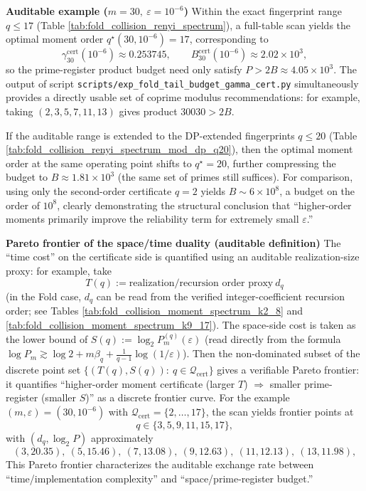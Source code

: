 \begin{remark}
\medskip\noindent\textbf{Auditable example (\(m=30,\ \varepsilon=10^{-6}\))}
Within the exact fingerprint range \(q\le 17\) (Table \ref{tab:fold_collision_renyi_spectrum}), a full-table scan yields the optimal moment order \(q^\star(30,10^{-6})=17\), corresponding to
\[
\gamma^{\mathrm{cert}}_{30}(10^{-6})\approx 0.253745,\qquad
B^{\mathrm{cert}}_{30}(10^{-6})\approx 2.02\times 10^3,
\]
so the prime-register product budget need only satisfy \(P>2B\approx 4.05\times 10^3\).
The output of script \texttt{scripts/exp\_fold\_tail\_budget\_gamma\_cert.py} simultaneously provides a directly usable set of coprime modulus recommendations: for example, taking \((2,3,5,7,11,13)\) gives product \(30030>2B\).
\par
If the auditable range is extended to the DP-extended fingerprints \(q\le 20\) (Table \ref{tab:fold_collision_renyi_spectrum_mod_dp_q20}), then the optimal moment order at the same operating point shifts to \(q^\star=20\), further compressing the budget to \(B\approx 1.81\times 10^3\) (the same set of primes still suffices).
For comparison, using only the second-order certificate \(q=2\) yields \(B\sim 6\times 10^8\), a budget on the order of $10^8$, clearly demonstrating the structural conclusion that ``higher-order moments primarily improve the reliability term for extremely small \(\varepsilon\).''

\medskip\noindent\textbf{Pareto frontier of the space/time duality (auditable definition)}
The ``time cost'' on the certificate side is quantified using an auditable realization-size proxy: for example, take
\[
T(q):=\text{realization/recursion order proxy}\ d_q
\]
(in the Fold case, \(d_q\) can be read from the verified integer-coefficient recursion order; see Tables \ref{tab:fold_collision_moment_spectrum_k2_8} and \ref{tab:fold_collision_moment_spectrum_k9_17}).
The space-side cost is taken as the lower bound of
\(
S(q):=\log_2 P_m^{(q)}(\varepsilon)
\)
(read directly from the formula \(\log P_m\gtrsim \log2+m\beta_q+\frac{1}{q-1}\log(1/\varepsilon)\)).
Then the non-dominated subset of the discrete point set
\(
\{(T(q),S(q)):\ q\in\mathcal{Q}_{\mathrm{cert}}\}
\)
gives a verifiable Pareto frontier: it quantifies ``higher-order moment certificate (larger \(T\)) \(\Rightarrow\) smaller prime-register (smaller \(S\))'' as a discrete frontier curve.
For the example \((m,\varepsilon)=(30,10^{-6})\) with \(\mathcal{Q}_{\mathrm{cert}}=\{2,\dots,17\}\), the scan yields frontier points at
\[
q\in\{3,5,9,11,15,17\},
\]
with \((d_q,\log_2 P)\) approximately
\[
(3,20.35),\ (5,15.46),\ (7,13.08),\ (9,12.63),\ (11,12.13),\ (13,11.98),
\]
This Pareto frontier characterizes the auditable exchange rate between ``time/implementation complexity'' and ``space/prime-register budget.''
\end{remark}


